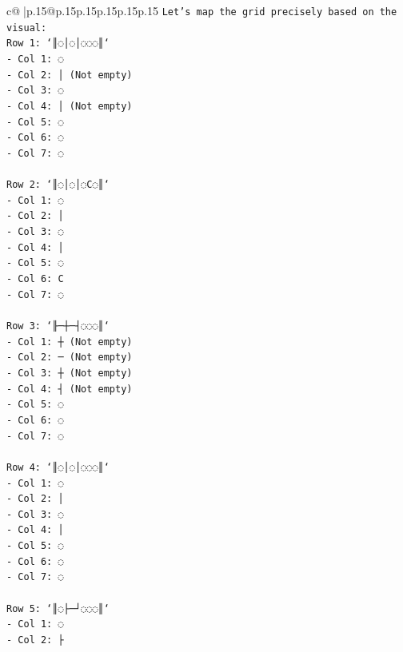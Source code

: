 \documentclass{article}
\begin{document}
{\begin{supertabular}{c@{$\;$}|p{.15\linewidth}@{}p{.15\linewidth}p{.15\linewidth}p{.15\linewidth}p{.15\linewidth}p{.15\linewidth}}
{{{\texttt{Let's map the grid precisely based on the visual:} \\
\texttt{Row 1: `║◌│◌│◌◌◌║`} \\
\texttt{{-} Col 1: ◌} \\
\texttt{{-} Col 2: │ (Not empty)} \\
\texttt{{-} Col 3: ◌} \\
\texttt{{-} Col 4: │ (Not empty)} \\
\texttt{{-} Col 5: ◌} \\
\texttt{{-} Col 6: ◌} \\
\texttt{{-} Col 7: ◌} \\
\\ 
\texttt{Row 2: `║◌│◌│◌C◌║`} \\
\texttt{{-} Col 1: ◌} \\
\texttt{{-} Col 2: │} \\
\texttt{{-} Col 3: ◌} \\
\texttt{{-} Col 4: │} \\
\texttt{{-} Col 5: ◌} \\
\texttt{{-} Col 6: C} \\
\texttt{{-} Col 7: ◌} \\
\\ 
\texttt{Row 3: `╟─┼─┤◌◌◌║`} \\
\texttt{{-} Col 1: ┼ (Not empty)} \\
\texttt{{-} Col 2: ─ (Not empty)} \\
\texttt{{-} Col 3: ┼ (Not empty)} \\
\texttt{{-} Col 4: ┤ (Not empty)} \\
\texttt{{-} Col 5: ◌} \\
\texttt{{-} Col 6: ◌} \\
\texttt{{-} Col 7: ◌} \\
\\ 
\texttt{Row 4: `║◌│◌│◌◌◌║`} \\
\texttt{{-} Col 1: ◌} \\
\texttt{{-} Col 2: │} \\
\texttt{{-} Col 3: ◌} \\
\texttt{{-} Col 4: │} \\
\texttt{{-} Col 5: ◌} \\
\texttt{{-} Col 6: ◌} \\
\texttt{{-} Col 7: ◌} \\
\\ 
\texttt{Row 5: `║◌├─┘◌◌◌║`} \\
\texttt{{-} Col 1: ◌} \\
\texttt{{-} Col 2: ├} \\
}}}
\end{supertabular}}
\end{document}
